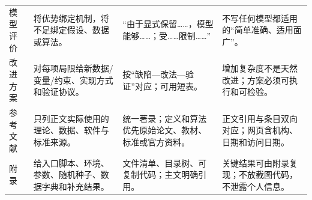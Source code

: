 \begin{longtable}{p{1.8cm}p{4.2cm}p{4.0cm}p{4.0cm}}
模型评价 & 将优势绑定机制，将不足绑定假设、数据或算法。 & “由于显式保留……，模型能够……；受……限制……” & 不写任何模型都适用的“简单准确、适用面广”。\\
改进方案 & 对每项局限给新数据/变量/约束、实现方式和验证协议。 & 按“缺陷—改法—验证”对应；可用短表。 & 增加复杂度不是天然改进；方案必须可执行和可检验。\\
参考文献 & 只列正文实际使用的理论、数据、软件与标准来源。 & 统一著录；定义和算法优先原始论文、教材、标准或官方资料。 & 正文引用与条目双向对应；网页含机构、日期和访问日期。\\
附录 & 给入口脚本、环境、参数、随机种子、数据字典和补充结果。 & 文件清单、目录树、可复制代码；主文明确引用。 & 关键结果可由附录复现；不放截图代码，不泄露个人信息。\\
\bottomrule
\end{longtable}

